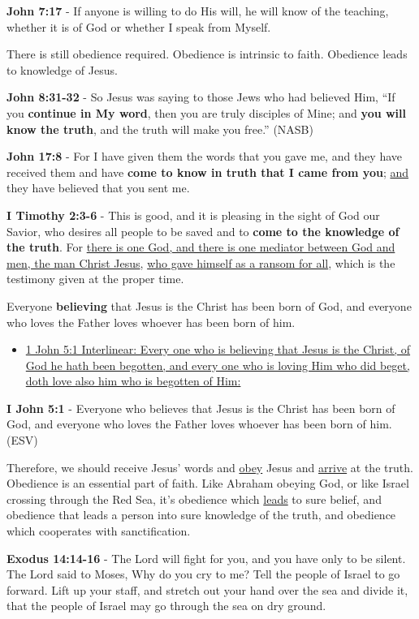 \documentclass[11pt]{article}
\begin{document}
\textbf{John 7:17} - If anyone is willing to do His will, he will know of the teaching, whether it is of God or whether I speak from Myself.

There is still obedience required. Obedience is intrinsic to faith. Obedience leads to knowledge of Jesus.

\textbf{John 8:31-32} - So Jesus was saying to those Jews who had believed Him, “If you \textbf{continue in My word}, then you are truly disciples of Mine; and \textbf{you will know the truth}, and the truth will make you free.” (NASB)

\textbf{John 17:8} - For I have given them the words that you gave me, and they have received them and have \textbf{come to know in truth that I came from you}; \uline{and} they have believed that you sent me.

\textbf{I Timothy 2:3-6} - This is good, and it is pleasing in the sight of God our Savior, who desires all people to be saved and to \textbf{come to the knowledge of the truth}. For \uline{there is one God, and there is one mediator between God and men, the man Christ Jesus}, \uline{who gave himself as a ransom for all}, which is the testimony given at the proper time.

Everyone \textbf{believing} that Jesus is the Christ has been born of God, and everyone who loves the Father loves whoever has been born of him.

\begin{itemize}
\item \href{https://biblehub.com/interlinear/1\_john/5-1.htm}{1 John 5:1 Interlinear: Every one who is believing that Jesus is the Christ, of God he hath been begotten, and every one who is loving Him who did beget, doth love also him who is begotten of Him:}
\end{itemize}

\textbf{I John 5:1} - Everyone who believes that Jesus is the Christ has been born of God, and everyone who loves the Father loves whoever has been born of him. (ESV)

Therefore, we should receive Jesus' words and \uline{obey} Jesus and \uline{arrive} at the truth. Obedience is an essential part of faith. Like Abraham obeying God, or like Israel crossing through the Red Sea, it's obedience which \uline{leads} to sure belief, and obedience that leads a person into sure knowledge of the truth, and obedience which cooperates with sanctification.

\textbf{Exodus 14:14-16} - The Lord will fight for you, and you have only to be silent.  The Lord said to Moses, Why do you cry to me? Tell the people of Israel to go forward.  Lift up your staff, and stretch out your hand over the sea and divide it, that the people of Israel may go through the sea on dry ground.
\end{document}
